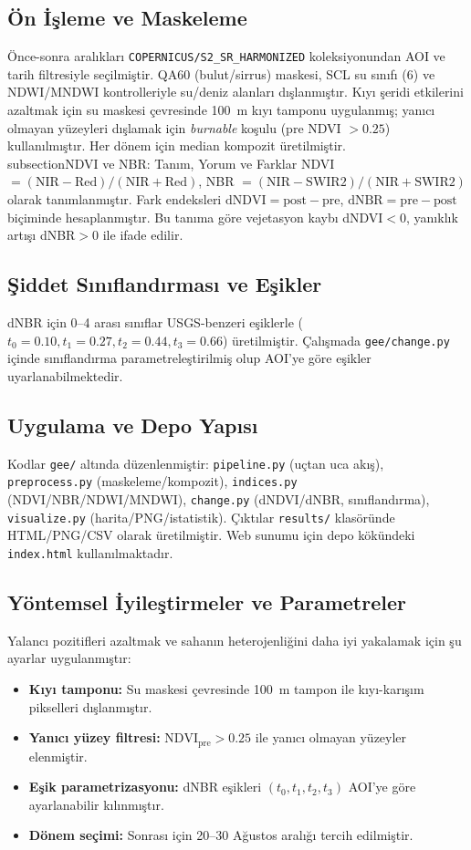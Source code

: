 \documentclass[11pt,a4paper]{article}
\begin{document}
\subsection{Ön İşleme ve Maskeleme}
Önce-sonra aralıkları \texttt{COPERNICUS/S2\_SR\_HARMONIZED} koleksiyonundan AOI ve tarih filtresiyle seçilmiştir. QA60 (bulut/sirrus) maskesi, SCL su sınıfı (6) ve NDWI/MNDWI kontrolleriyle su/deniz alanları dışlanmıştır. Kıyı şeridi etkilerini azaltmak için su maskesi çevresinde \SI{100}{m} kıyı tamponu uygulanmış; yanıcı olmayan yüzeyleri dışlamak için \emph{burnable} koşulu (pre NDVI $>0.25$) kullanılmıştır. Her dönem için median kompozit üretilmiştir.
\\subsection{NDVI ve NBR: Tanım, Yorum ve Farklar}
NDVI $=(\mathrm{NIR}-\mathrm{Red})/(\mathrm{NIR}+\mathrm{Red})$, NBR $=(\mathrm{NIR}-\mathrm{SWIR2})/(\mathrm{NIR}+\mathrm{SWIR2})$ olarak tanımlanmıştır. Fark endeksleri \(\mathrm{dNDVI}=\mathrm{post}-\mathrm{pre}\), \(\mathrm{dNBR}=\mathrm{pre}-\mathrm{post}\) biçiminde hesaplanmıştır. Bu tanıma göre vejetasyon kaybı dNDVI$<0$, yanıklık artışı dNBR$>0$ ile ifade edilir.

\subsection{Şiddet Sınıflandırması ve Eşikler}
dNBR için 0--4 arası sınıflar USGS-benzeri eşiklerle (\(t_0=0.10, t_1=0.27, t_2=0.44, t_3=0.66\)) üretilmiştir. Çalışmada \texttt{gee/change.py} içinde sınıflandırma parametreleştirilmiş olup AOI'ye göre eşikler uyarlanabilmektedir.

\subsection{Uygulama ve Depo Yapısı}
Kodlar \texttt{gee/} altında düzenlenmiştir: \texttt{pipeline.py} (uçtan uca akış), \texttt{preprocess.py} (maskeleme/kompozit), \texttt{indices.py} (NDVI/NBR/NDWI/MNDWI), \texttt{change.py} (dNDVI/dNBR, sınıflandırma), \texttt{visualize.py} (harita/PNG/istatistik). Çıktılar \texttt{results/} klasöründe HTML/PNG/CSV olarak üretilmiştir. Web sunumu için depo kökündeki \texttt{index.html} kullanılmaktadır.

\subsection{Yöntemsel İyileştirmeler ve Parametreler}
Yalancı pozitifleri azaltmak ve sahanın heterojenliğini daha iyi yakalamak için şu ayarlar uygulanmıştır:
\begin{itemize}
  \item \textbf{Kıyı tamponu:} Su maskesi çevresinde \SI{100}{m} tampon ile kıyı-karışım pikselleri dışlanmıştır.
  \item \textbf{Yanıcı yüzey filtresi:} \(\mathrm{NDVI}_{\text{pre}}>0.25\) ile yanıcı olmayan yüzeyler elenmiştir.
  \item \textbf{Eşik parametrizasyonu:} dNBR eşikleri \((t_0,t_1,t_2,t_3)\) AOI'ye göre ayarlanabilir kılınmıştır.
  \item \textbf{Dönem seçimi:} Sonrası için 20--30 Ağustos aralığı tercih edilmiştir.
\end{itemize}
\end{document}
